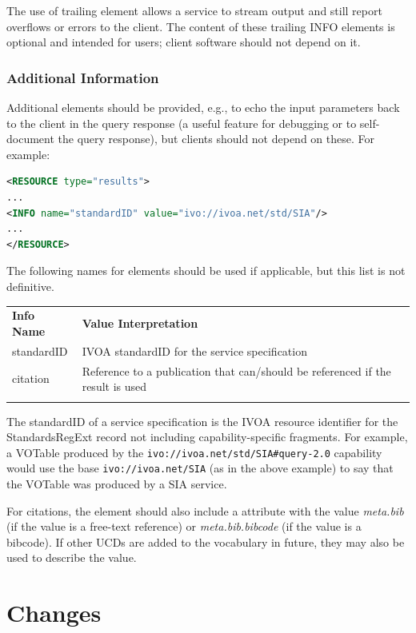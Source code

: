 \documentclass[11pt,letter]{ivoa}
\begin{document}
The use of trailing  element allows a service to stream output and still
report overflows or errors to the client. The content of these trailing INFO
elements is optional and intended for users; client software should not depend
on it.

\subsubsection{Additional Information}
Additional  elements should be provided, e.g., to echo the input parameters
back to the client in the query response (a useful feature for debugging or to
self-document the query response), but clients should not depend on these. For
example:

\begin{lstlisting}[language=XML]
<RESOURCE type="results">
...
<INFO name="standardID" value="ivo://ivoa.net/std/SIA"/>
...
</RESOURCE>
\end{lstlisting}

The following names for  elements should be used if applicable, but this
list is not definitive.

\begin{tabular}{l p{8cm}}
\sptablerule
\textbf{Info Name}&\textbf{Value Interpretation}\\
\sptablerule
standardID & IVOA standardID for the service specification \\
citation & Reference to a publication that can/should be referenced if the
result is used \\
\sptablerule
\end{tabular}

The standardID of a service specification is the IVOA resource identifier for
the StandardsRegExt record not including capability-specific fragments. For example,
a VOTable produced by the \verb|ivo://ivoa.net/std/SIA#query-2.0| capability
would use the base \verb|ivo://ivoa.net/SIA| (as in the above example) to say that
the VOTable was produced by a SIA service.

For citations, the  element should also include a
 attribute with the
value \emph{meta.bib} (if the value is a free-text reference) or
\emph{meta.bib.bibcode} (if
the value is a bibcode). If other  UCDs are added to the vocabulary in
future, they may also be used to describe the value.

\appendix

\section{Changes}
\end{document}
